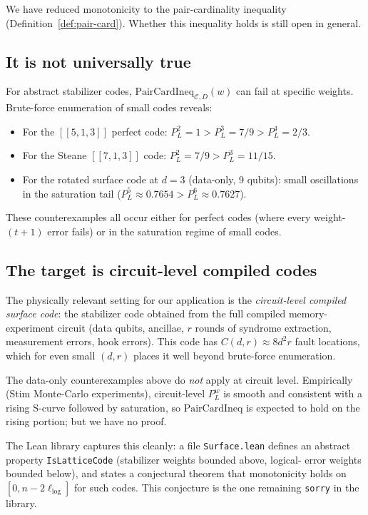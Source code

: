 \documentclass[11pt]{article}
\theoremstyle{definition}
\theoremstyle{remark}
\begin{document}
We have reduced monotonicity to the pair-cardinality inequality
(Definition~\ref{def:pair-card}).  Whether this inequality holds
is still open in general.

\subsection{It is not universally true}

For abstract stabilizer codes, $\mathrm{PairCardIneq}_{\mathcal{C},
D}(w)$ can fail at specific weights.  Brute-force enumeration
of small codes reveals:

\begin{itemize}
\item For the $[[5,1,3]]$ perfect code:
$P_L^2 = 1 > P_L^3 = 7/9 > P_L^4 = 2/3$.
\item For the Steane $[[7,1,3]]$ code:
$P_L^2 = 7/9 > P_L^3 = 11/15$.
\item For the rotated surface code at $d = 3$ (data-only, 9
    qubits): small oscillations in the saturation tail
    ($P_L^5 \approx 0.7654 > P_L^6 \approx 0.7627$).
\end{itemize}

These counterexamples all occur either for perfect codes (where
every weight-$(t+1)$ error fails) or in the saturation regime of
small codes.

\subsection{The target is circuit-level compiled codes}

The physically relevant setting for our application is the
\emph{circuit-level compiled surface code}: the stabilizer code
obtained from the full compiled memory-experiment circuit
(data qubits, ancillae, $r$ rounds of syndrome extraction,
measurement errors, hook errors).  This code has
$C(d, r) \approx 8 d^2 r$ fault locations, which for even small
$(d, r)$ places it well beyond brute-force enumeration.

The data-only counterexamples above do \emph{not} apply at circuit
level.  Empirically (Stim Monte-Carlo experiments), circuit-level
$P_L^w$ is smooth and consistent with a rising S-curve followed by
saturation, so $\mathrm{PairCardIneq}$ is expected to hold on the
rising portion; but we have no proof.

The Lean library captures this cleanly: a file
\texttt{Surface.lean} defines an abstract property
\texttt{IsLatticeCode} (stabilizer weights bounded above, logical-
error weights bounded below), and states a conjectural theorem
that monotonicity holds on $[0, n - 2 \ell_{\log}]$ for such codes.
This conjecture is the one remaining \texttt{sorry} in the library.
\end{document}
